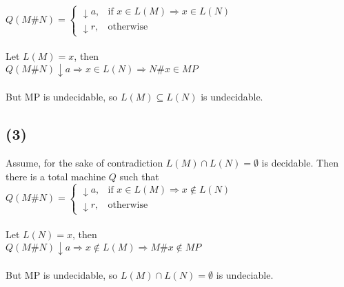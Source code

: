 \documentclass[12pt]{article}
\begin{document}
$Q(M\#N) = \begin{cases}
              \downarrow a, & \mbox{if } x \in L(M) \Rightarrow x \in L(N)\\
              \downarrow r, & \mbox{otherwise}
           \end{cases}$\\
\\
Let $L(M) = {x}$, then\\

    $Q(M\#N) \downarrow a \Rightarrow x \in L(N) \Rightarrow N\#x \in MP$\\
\\
But MP is undecidable, so $L(M) \subseteq L(N)$ is undecidable.

\subsection*{(3)}
Assume, for the sake of contradiction $L(M) \cap L(N) = \emptyset$ is decidable. Then 
there is a total machine $Q$ such that\\

$Q(M\#N) = \begin{cases}
              \downarrow a, & \mbox{if } x \in L(M) \Rightarrow x \notin L(N)\\
              \downarrow r, & \mbox{otherwise}
           \end{cases}$\\
\\
Let $L(N) = {x}$, then\\

$Q(M\#N) \downarrow a \Rightarrow x \notin L(M) \Rightarrow M\#x \notin MP$\\
\\
But MP is undecidable, so $L(M) \cap L(N) = \emptyset$ is undeciable.
\end{document}
